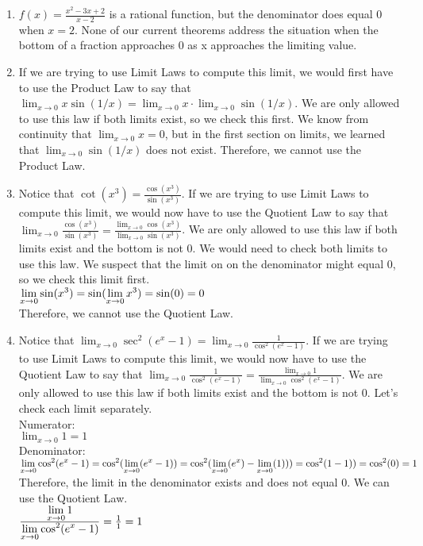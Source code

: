 \documentclass{ximera}
\begin{document}
\begin{question}
\begin{feedback}
\begin{enumerate}
    \item $f(x)=\frac{x^2-3x+2}{x-2}$ is a rational function, but the denominator does equal 0 when $x=2$.  None of our current theorems address the situation when the bottom of a fraction approaches 0 as x approaches the limiting value.
     
    \item If we are trying to use Limit Laws to compute this limit, we would first have to use the Product Law to say that  
    $\lim_{x\to 0} x\sin(1/x)= \lim_{x\to 0} x \cdot \lim_{x\to 0} \sin(1/x).$  We are only allowed to use this law if both limits exist, so we check this first.  We know from continuity that $\lim_{x\to 0}x=0$, but in the first section on limits, we learned that $\lim_{x\to 0} \sin(1/x)$  does not exist.  Therefore, we cannot use the Product Law.
     
    \item Notice that $\cot(x^3) = \frac{\cos(x^3)}{\sin(x^3)}$.  If we are trying to use Limit Laws to compute this limit, we would now have to use the Quotient Law to say that $\lim_{x\to 0} \frac{\cos(x^3)}{\sin(x^3)}
    = \frac{\lim_{x\to 0} \cos(x^3)}{\lim_{x\to 0} \sin(x^3)}$.  We are only allowed to use this law if both limits exist and the bottom is not 0. We would need to check both limits to use this law.  We suspect that the limit on on the denominator might equal 0, so we check this limit first.\\
    $\lim_{x\to 0} \sin(x^3)\\
    = \sin(\lim_{x\to 0}x^3)\\
    =\sin(0)=0$ \\
    Therefore, we cannot use the Quotient Law.
      
    \item  Notice that $\lim_{x\to 0} \sec^2(e^x-1) = \lim_{x\to 0} \frac{1}{\cos^2(e^x-1)}$.  If we are trying to use Limit Laws to compute this limit, we would now have to use the Quotient Law to say that $\lim_{x\to 0} \frac{1}{\cos^2(e^x-1)} = \frac{ \lim_{x\to 0}1}{ \lim_{x\to 0}\cos^2(e^x-1)}$.  We are only allowed to use this law if both limits exist and the bottom is not 0.  Let's check each limit separately.\\
   Numerator:\\
   $\lim_{x\to 0}1=1$\\
   Denominator:\\
   $\lim_{x\to 0}\cos^2(e^x-1)\\
   = \cos^2(\lim_{x\to 0}(e^x-1))\\
   = \cos^2(\lim_{x\to 0}(e^x)-\lim_{x\to 0}(1)))\\
   = \cos^2(1-1))\\
   = \cos^2(0)=1$\\
   Therefore, the limit in the denominator exists and does not equal 0.  We can use the Quotient Law.\\
   $\frac{ \lim_{x\to 0}1}{ \lim_{x\to 0}\cos^2(e^x-1)} = \frac{1}{1}=1\\ $
   

\end{enumerate}
\end{feedback}
\end{question}
\end{document}
